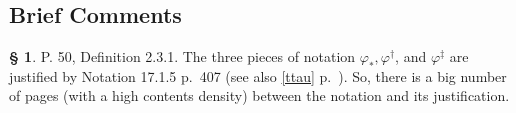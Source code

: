 \documentclass[12pt]{article}
\theoremstyle{remark}
\theoremstyle{definition}
\newtheorem{s}[thm]{\S}
\newcommand{\nn}{\noindent}
\newcommand{\C}{\mathcal C}
\DeclareMathOperator*{\co}{colim}
\DeclareMathOperator{\hy}{h}
\DeclareMathOperator{\Hom}{Hom}%
\begin{document}
\subsection{Brief Comments}
%
\begin{s}\label{231}
P. 50, Definition 2.3.1. The three pieces of notation $\varphi_*,\varphi^\dagger$, and $\varphi^\ddagger$ are justified by Notation 17.1.5 p.~407 (see also \eqref{ttau} p.~\pageref{ttau}). So, there is a big number of pages (with a high contents density) between the notation and its justification. %
\end{s}
%
%
\begin{comment}
\nn $*$ P.~63, Notation 2.7.2. Recall the setting: The diagram
$$
\begin{tikzcd}
\C\ar{d}[swap]{\hy_\C}\ar{r}{F}&\C'\ar{d}{\hy_{\C'}}\\ 
\C^\wedge\ar{r}[swap]{\widehat F}&\C'^\wedge
\end{tikzcd}
$$ 
commutes up to isomorphism, $\C$ and $\C'$ are small, and we have 
$$
\widehat F(A)(V)\simeq\co_{(U\to A)\in\C_A}\Hom_{\C'}(V,F(U)).
$$ 
The purpose of this comment is just to note that we also have by Corollary 2.4.6 p.~56 
\begin{equation}\label{272}
\widehat F(A)(V)\simeq\co_{(U\to F(V))\in\C^U}A(U).
\end{equation}
\end{comment}
%
\end{document}
